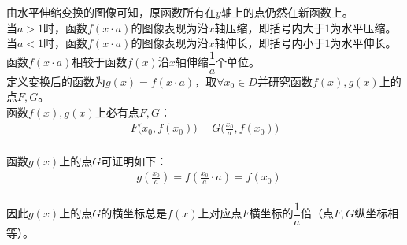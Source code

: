 \documentclass[UTF8]{ctexart}
\begin{document}
    由水平伸缩变换的图像可知，原函数所有在$y$轴上的点仍然在新函数上。\\[3mm]
    当$a>1$时，函数$f(x\cdot a)$的图像表现为沿$x$轴压缩，即括号内大于$1$为水平压缩。\\[3mm]
    当$a<1$时，函数$f(x\cdot a)$的图像表现为沿$x$轴伸长，即括号内小于$1$为水平伸长。\\[3mm]
    函数$f(x\cdot a)$相较于函数$f(x)$沿$x$轴伸缩$\dfrac{1}{a}$个单位。\\[7mm]
    定义变换后的函数为$g(x)=f(x\cdot a)$，取$\forall x_0\in D$并研究函数$f(x),g(x)$上的点$F,G$。\\[3mm]
    函数$f(x),g(x)$上必有点$F,G$：
    \begin{align}
        F\big(x_0,f(x_0)\big)~~~~~~G\big(\frac{x_0}{a},f(x_0)\big)
    \end{align}\\
    函数$g(x)$上的点$G$可证明如下：
    \begin{align}
        &g(\frac{x_0}{a})=f(\frac{x_0}{a}\cdot a)=f(x_0)
    \end{align}\\
    因此$g(x)$上的点$G$的横坐标总是$f(x)$上对应点$F$横坐标的$\dfrac{1}{a}$倍（点$F,G$纵坐标相等）。

\newpage
\end{document}
